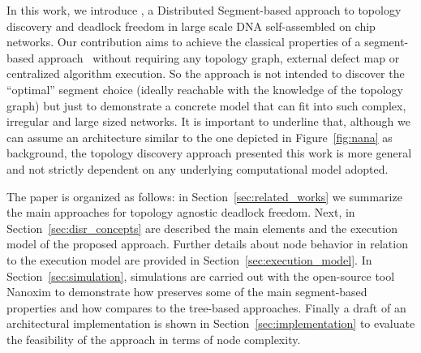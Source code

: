 In this work, we introduce \disr{}, a Distributed Segment-based
approach to topology discovery and deadlock freedom in large scale DNA
self-assembled on chip networks. Our contribution aims to achieve the
classical properties of a segment-based approach~\cite{mejia_ipdps06}
without requiring any topology graph, external defect map or
centralized algorithm execution.  So the \disr{} approach is not
intended to discover the ``optimal'' segment choice (ideally reachable
with the knowledge of the topology graph) but just to demonstrate a
concrete model that can fit into such complex, irregular and large
sized networks.  It is important to underline that, although we can
assume an architecture similar to the one depicted in
Figure~\ref{fig:nana} as background, the \disr{} topology discovery
approach presented this work is more general and not strictly
dependent on any underlying computational model adopted.

The paper is organized as follows: in Section~\ref{sec:related_works}
we summarize the main approaches for topology agnostic deadlock
freedom. Next, in
Section~\ref{sec:disr_concepts} are described the main elements and
the execution model of the proposed approach. Further details about node behavior
in relation to the execution model are provided in Section~\ref{sec:execution_model}. 
In Section~\ref{sec:simulation},
simulations are carried out with the open-source tool Nanoxim to
demonstrate how \disr{} preserves some of the main segment-based
properties and how compares to the tree-based approaches. Finally a
draft of an architectural implementation is shown in
Section~\ref{sec:implementation} to evaluate the feasibility of the
approach in terms of node complexity.

